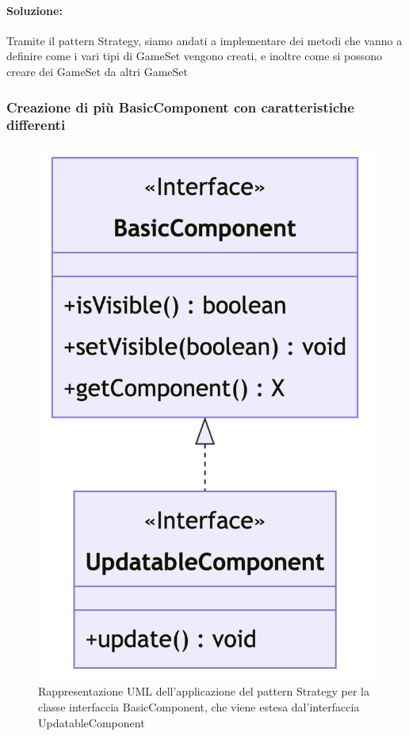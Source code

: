 \paragraph{Soluzione:}
Tramite il pattern Strategy, siamo andati a implementare dei metodi che vanno a definire come i vari tipi di GameSet vengono creati, e inoltre come si possono creare dei GameSet da altri GameSet
\clearpage

\subsubsection*{Creazione di più BasicComponent con caratteristiche differenti}
\begin{figure}[ht]
    \centering\includegraphics[scale=.3]{images/basiccomponent.png}
    \caption{Rappresentazione UML dell'applicazione del pattern Strategy per la classe interfaccia BasicComponent, che viene estesa dal'interfaccia  UpdatableComponent}
\end{figure}

